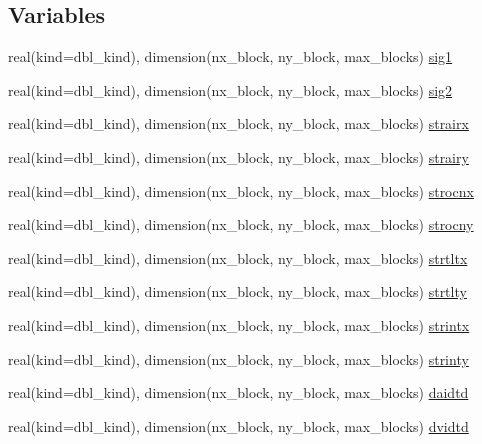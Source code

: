 \subsection*{Variables}
\begin{DoxyCompactItemize}
\item 
real(kind=dbl\_\-kind), dimension(nx\_\-block, ny\_\-block, max\_\-blocks) \hyperlink{namespaceice__flux_a4e0e291e34267f30266f8a41db36affb}{sig1}
\item 
real(kind=dbl\_\-kind), dimension(nx\_\-block, ny\_\-block, max\_\-blocks) \hyperlink{namespaceice__flux_a7bf5a07a0946af77cd35135d6ce11771}{sig2}
\item 
real(kind=dbl\_\-kind), dimension(nx\_\-block, ny\_\-block, max\_\-blocks) \hyperlink{namespaceice__flux_aee8a0e6c9637760d2b7153f40ffe0dc1}{strairx}
\item 
real(kind=dbl\_\-kind), dimension(nx\_\-block, ny\_\-block, max\_\-blocks) \hyperlink{namespaceice__flux_af29d53fccf8950eaca0c31ea018640aa}{strairy}
\item 
real(kind=dbl\_\-kind), dimension(nx\_\-block, ny\_\-block, max\_\-blocks) \hyperlink{namespaceice__flux_a3302aaf2e5a99949808d98b685228ecf}{strocnx}
\item 
real(kind=dbl\_\-kind), dimension(nx\_\-block, ny\_\-block, max\_\-blocks) \hyperlink{namespaceice__flux_a0e146ebf56010398ef99ba1539dbc1ce}{strocny}
\item 
real(kind=dbl\_\-kind), dimension(nx\_\-block, ny\_\-block, max\_\-blocks) \hyperlink{namespaceice__flux_a1380a09740e78ddbcc3abe4edc2b3e2f}{strtltx}
\item 
real(kind=dbl\_\-kind), dimension(nx\_\-block, ny\_\-block, max\_\-blocks) \hyperlink{namespaceice__flux_ac9c1e92371b4e39d2aa9f38548b011ff}{strtlty}
\item 
real(kind=dbl\_\-kind), dimension(nx\_\-block, ny\_\-block, max\_\-blocks) \hyperlink{namespaceice__flux_aff350f7a31d4c9cc9429ef1a14d1c91f}{strintx}
\item 
real(kind=dbl\_\-kind), dimension(nx\_\-block, ny\_\-block, max\_\-blocks) \hyperlink{namespaceice__flux_a8bfac55007c715a028b0ac9b8e9daed5}{strinty}
\item 
real(kind=dbl\_\-kind), dimension(nx\_\-block, ny\_\-block, max\_\-blocks) \hyperlink{namespaceice__flux_a24c9cd15dee4efbf6d35e4bafb03a6e0}{daidtd}
\item 
real(kind=dbl\_\-kind), dimension(nx\_\-block, ny\_\-block, max\_\-blocks) \hyperlink{namespaceice__flux_ab2731d6607c7b88522d1a843d4a38a50}{dvidtd}
\item 

\end{DoxyCompactItemize}
